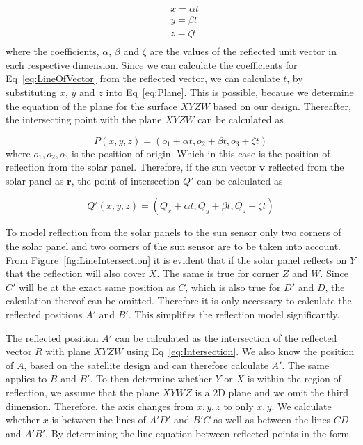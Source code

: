 \documentclass[letterpaper, 10 pt, conference]{ieeeconf}  %
\begin{document}
\begin{equation}
	\begin{aligned}
	&	x = \alpha t \\
	&	y = \beta t \\
	&	z = \zeta t \\
	\end{aligned}
\label{eq:LineOfVector}
\end{equation}
where the coefficients, $\alpha$, $\beta$ and $\zeta$ are the values of the reflected unit vector in each respective dimension. Since we can calculate the coefficients for Eq~\ref{eq:LineOfVector} from the reflected vector, we can calculate $t$, by substituting $x$, $y$ and $z$ into Eq~\ref{eq:Plane}. This is possible, because we determine the equation of the plane for the surface $XYZW$ based on our design. Thereafter, the intersecting point with the plane $XYZW$ can be calculated as

\begin{equation}
	P(x, y, z) = (o_1 + \alpha t, o_2 + \beta t, o_3 + \zeta t)
	\label{eq:Intersection}
\end{equation}
where $o_1, o_2, o_3$ is the position of origin. Which in this case is the position of reflection from the solar panel. Therefore, if the sun vector $\mathbf{v}$ reflected from the solar panel as $\mathbf{r}$, the point of intersection $Q'$ can be calculated as

\begin{equation}
	Q'(x, y, z) = (Q_x + \alpha t, Q_y + \beta t, Q_z + \zeta t)
	\label{eq:SpecificIntersection}
\end{equation}

To model reflection from the solar panels to the sun sensor only two corners of the solar panel and two corners of the sun sensor are to be taken into account. From Figure~\ref{fig:LineIntersection} it is evident that if the solar panel reflects on $Y$ that the reflection will also cover $X$. The same is true for corner $Z$ and $W$. Since $C'$ will be at the exact same position as $C$, which is also true for $D'$ and $D$, the calculation thereof can be omitted. Therefore it is only necessary to calculate the reflected positions $A'$ and $B'$. This simplifies the reflection model significantly.

The reflected position $A'$ can be calculated as the intersection of the reflected vector $R$ with plane $XYZW$ using Eq~\ref{eq:Intersection}. We also know the position of $A$, based on the satellite design and can therefore calculate $A'$. The same applies to $B$ and $B'$. To then determine whether $Y$ or $X$ is within the region of reflection, we assume that the plane $XYWZ$ is a 2D plane and we omit the third dimension. Therefore, the axis changes from $x, y, z$ to only $x, y$. We calculate whether $x$ is between the lines of $A'D'$ and $B'C$ as well as between the lines $CD$ and $A'B'$. By determining the line equation between reflected points in the form 
\end{document}
